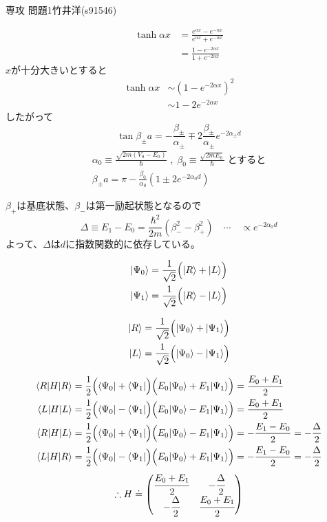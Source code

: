 \documentclass[fleqn]{jbook}
\begin{document}
\begin{answer}{専攻 問題1}{竹井洋(s91546)}
\begin{subanswers}
\begin{align*}
\tanh\alpha x &= \frac{e^{\alpha x}-e^{-\alpha x}}{e^{\alpha x}+e^{-\alpha x}} \\
&= \frac{1-e^{-2\alpha x}}{1+e^{-2\alpha x}}
\end{align*}
$x$が十分大きいとすると
\begin{align*}
\tanh\alpha x &\sim \left(1-e^{-2\alpha x}\right)^2 \\
&\sim 1-2e^{-2\alpha x}
\end{align*}
したがって
\[ \tan\beta_{\pm}a=-\frac{\beta_{\pm}}{\alpha_{\pm}}\mp 2\frac{\beta_{\pm}}{\alpha_{\pm}}e^{-2\alpha_{\pm}d} \]
\begin{gather*}
\alpha_0\equiv\frac{\sqrt{2m(V_0-E_0)}}{\hbar}\; ,\;\beta_0\equiv \frac{\sqrt{2mE_0}}{\hbar}\;\text{とすると}\\
\beta_{\pm}a=\pi-\frac{\beta_0}{\alpha_0}\left(1\pm2e^{-2\alpha_0 d}\right)
\end{gather*}

$\beta_+$は基底状態、$\beta_-$は第一励起状態となるので
\[ \Delta\equiv E_1-E_0=\frac{\hbar^2}{2m}\left(\beta_-^2-\beta_+^2\right) \quad \cdots \quad \propto e^{-2\alpha_0d} \]
よって、$\Delta$は$d$に指数関数的に依存している。

\SubAnswer

\begin{align*}
\Ket{\Psi_0}&=\frac{1}{\sqrt{2}}\Bigl( \Ket{R}+\Ket{L}\Bigr) \\
\Ket{\Psi_1}&=\frac{1}{\sqrt{2}}\Bigl( \Ket{R}-\Ket{L}\Bigr)
\end{align*}

\SubAnswer

\begin{align*}
\Ket{R}&=\frac{1}{\sqrt{2}}\Bigl( \Ket{\Psi_0}+\Ket{\Psi_1}\Bigr) \\
\Ket{L}&=\frac{1}{\sqrt{2}}\Bigl( \Ket{\Psi_0}-\Ket{\Psi_1}\Bigr)
\end{align*}

\begin{align*}
\Bracket{R}{H}{R} &= \frac{1}{2}\Bigl(\Bra{\Psi_0}+\Bra{\Psi_1}\Bigr)\Bigl(E_0\Ket{\Psi_0}+E_1\Ket{\Psi_1}\Bigr)
= \frac{E_0+E_1}{2} \\
\Bracket{L}{H}{L} &= \frac{1}{2}\Bigl(\Bra{\Psi_0}-\Bra{\Psi_1}\Bigr)\Bigl(E_0\Ket{\Psi_0}-E_1\Ket{\Psi_1}\Bigr)
= \frac{E_0+E_1}{2} \\
\Bracket{R}{H}{L} &= \frac{1}{2}\Bigl(\Bra{\Psi_0}+\Bra{\Psi_1}\Bigr)\Bigl(E_0\Ket{\Psi_0}-E_1\Ket{\Psi_1}\Bigr)
= -\frac{E_1-E_0}{2}
= -\frac{\Delta}{2} \\
\Bracket{L}{H}{R} &= \frac{1}{2}\Bigl(\Bra{\Psi_0}-\Bra{\Psi_1}\Bigr)\Bigl(E_0\Ket{\Psi_0}+E_1\Ket{\Psi_1}\Bigr)
= -\frac{E_1-E_0}{2}
= -\frac{\Delta}{2} \\
\end{align*}
\[ 
\therefore H \doteq
\begin{pmatrix}
\cfrac{E_0+E_1}{2} & -\cfrac{\Delta}{2} \\
-\cfrac{\Delta}{2} & \cfrac{E_0+E_1}{2}
\end{pmatrix}
\]
\\



\end{subanswers}
\end{answer}
\end{document}
